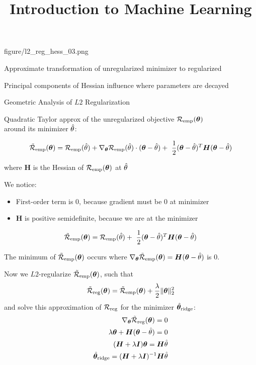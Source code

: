 \documentclass[11pt,compress,t,notes=noshow, xcolor=table]{beamer}
\title{Introduction to Machine Learning}
\begin{document}
{figure/l2_reg_hess_03.png} {
  \item Approximate transformation of unregularized minimizer to regularized 
  \item Principal components of Hessian influence where parameters are decayed  
}

\begin{vbframe}{Geometric Analysis of $L2$ Regularization}

Quadratic Taylor approx of the unregularized objective $\mathcal{R}_{\text{emp}}(\bm{\theta})$ \\
around its minimizer $\hat{\theta}$:

$$ \mathcal{\tilde R}_{\text{emp}}(\bm{\theta})= \mathcal{R}_{\text{emp}}(\hat{\theta}) + \nabla_{\bm{\theta}} \mathcal{R}_{\text{emp}}(\hat{\theta})\cdot(\bm{\theta} - \hat{\theta}) + \ \frac{1}{2} (\bm{\theta} - \hat{\theta})^T \bm{H} (\bm{\theta} - \hat{\theta}) $$

where $\bm{H}$ is the Hessian of $\mathcal{R}_{\text{emp}}(\bm{\theta})$ at $\hat{\theta}$

\lz \lz 

We notice:

\begin{itemize}
  \item First-order term is 0, because gradient must be $0$ at minimizer
  \item $\bm{H}$ is positive semidefinite, because we are at the minimizer
\end{itemize}


$$ \mathcal{\tilde R}_{\text{emp}}(\bm{\theta})= \mathcal{R}_{\text{emp}}(\hat{\theta}) + \ \frac{1}{2} (\bm{\theta} - \hat{\theta})^T \bm{H} (\bm{\theta} - \hat{\theta}) $$


\lz

\framebreak

\normalsize

The minimum of $\mathcal{\tilde R}_{\text{emp}}(\bm{\theta})$ occurs where $\nabla_{\bm{\theta}}\mathcal{\tilde R}_{\text{emp}}(\bm{\theta}) = \bm{H}(\bm{\theta} - \hat{\theta})$ is $0$.

Now we $L2$-regularize $\mathcal{\tilde R}_{\text{emp}}(\bm{\theta})$, such that 
\[
\mathcal{\tilde R}_{\text{reg}}(\bm{\theta}) = \mathcal{\tilde R}_{\text{emp}}(\bm{\theta}) + \frac{\lambda}{2} \|\bm{\theta}\|^2_2\]
and solve this approximation of $\mathcal{R}_{\text{reg}}$ for the minimizer $\hat{\bm{\theta}}_{\text{ridge}}$:
\begin{align*}
 \nabla_{\bm{\theta}}\mathcal{\tilde R}_{\text{reg}}(\bm{\theta}) = 0\\
  \lambda \bm{\theta} + \bm{H}(\bm{\theta} - \hat{\theta}) = 0\\
      (\bm{H} + \lambda \bm{I}) \bm{\theta} = \bm{H} \hat{\theta}\\
      \hat{\bm{\theta}}_{\text{ridge}} = (\bm{H} + \lambda \bm{I})^{-1}\bm{H} \hat{\theta}
\end{align*}


\end{vbframe}
\end{document}

